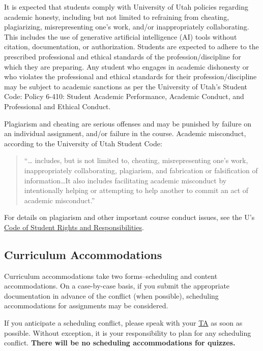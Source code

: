 \documentclass[
  letterpaper,
]{article}
\begin{document}
It is expected that students comply with University of Utah policies
regarding academic honesty, including but not limited to refraining from
cheating, plagiarizing, misrepresenting one's work, and/or
inappropriately collaborating. This includes the use of generative
artificial intelligence (AI) tools without citation, documentation, or
authorization. Students are expected to adhere to the prescribed
professional and ethical standards of the profession/discipline for
which they are preparing. Any student who engages in academic dishonesty
or who violates the professional and ethical standards for their
profession/discipline may be subject to academic sanctions as per the
University of Utah's Student Code: Policy 6-410: Student Academic
Performance, Academic Conduct, and Professional and Ethical Conduct.

Plagiarism and cheating are serious offenses and may be punished by
failure on an individual assignment, and/or failure in the course.
Academic misconduct, according to the University of Utah Student Code:

\begin{quote}
``\ldots{} includes, but is not limited to, cheating, misrepresenting
one's work, inappropriately collaborating, plagiarism, and fabrication
or falsification of information\ldots It also includes facilitating
academic misconduct by intentionally helping or attempting to help
another to commit an act of academic misconduct.''
\end{quote}

For details on plagiarism and other important course conduct issues, see
the U's \href{http://regulations.utah.edu/academics/6-400.php}{Code of
Student Rights and Responsibilities}.

\subsection{Curriculum Accommodations}\label{curriculum-accommodations}

Curriculum accommodations take two forms--scheduling and content
accommodations. On a case-by-case basis, if you submit the appropriate
documentation in advance of the conflict (when possible), scheduling
accommodations for assignments may be considered.

If you anticipate a scheduling conflict, please speak with your
\hyperref[sec-ta]{TA} as soon as possible. Without exception, it is your
responsibility to plan for any scheduling conflict. \textbf{There will
be no scheduling accommodations for quizzes.}
\end{document}
